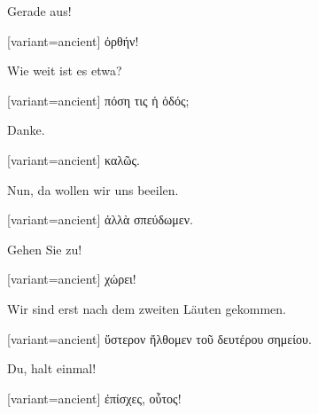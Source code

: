 Gerade aus!

\switchcolumn

\begin{greek}[variant=ancient]%
ὀρθήν!

\end{greek}%
\switchcolumn*

Wie weit ist es etwa?

\switchcolumn

\begin{greek}[variant=ancient]%
πόση τις ἡ ὁδός;

\end{greek}%
\switchcolumn*

Danke.

\switchcolumn

\begin{greek}[variant=ancient]%
καλῶς.

\end{greek}%
\switchcolumn*

Nun, da wollen wir uns beeilen.

\switchcolumn

\begin{greek}[variant=ancient]%
ἀλλὰ σπεύδωμεν.

\end{greek}%
\switchcolumn*

Gehen Sie zu!

\switchcolumn

\begin{greek}[variant=ancient]%
χώρει!

\end{greek}%
\switchcolumn*

Wir sind erst nach dem zweiten Läuten gekommen.

\switchcolumn

\begin{greek}[variant=ancient]%
ὕστερον ἤλθομεν τοῦ δευτέρου σημείου.

\end{greek}%
\indent Du, halt einmal!

\switchcolumn

\begin{greek}[variant=ancient]%
ἐπίσχες, οὗτος!

\end{greek}%
\switchcolumn*

